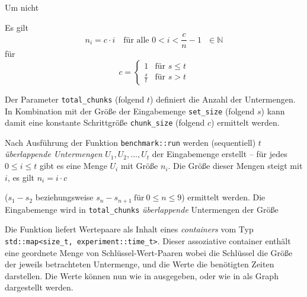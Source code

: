 Um nicht 

Es gilt
\begin{equation*}
	n_i = c \cdot i \quad \text{für alle $0 < i < \frac{c}{n} - 1$ $\in \mathbb{N}$}
\end{equation*}
für
\begin{equation*}
	c = \begin{cases}
		1 & \text{für $s \leq t$}\\
		\frac{s}{t} & \text{für $s > t$}
	\end{cases}
\end{equation*}

Der Parameter \lstinline{total_chunks} (folgend $t$) definiert die Anzahl der Untermengen. In Kombination mit der Größe der Eingabemenge \lstinline{set_size} (folgend $s$) kann damit eine konstante Schrittgröße \lstinline{chunk_size} (folgend $c$) ermittelt werden.

Nach Ausführung der Funktion \lstinline{benchmark::run} werden (sequentiell) $t$ \emph{überlappende Untermengen} $U_1, U_2, \ldots, U_t$ der Eingabemenge erstellt -- für jedes $0 \leq i \leq t$ gibt es eine Menge $U_i$ mit Größe $n_i$. Die Größe dieser Mengen steigt mit $i$, es gilt $n_i = i \cdot c$

($s_1 - s_2$ beziehungsweise $s_n - s_{n + 1}\ \text{für}\ 0 \leq n \le 9$) ermittelt werden. Die Eingabemenge wird in \lstinline{total_chunks} \emph{überlappende} Untermengen der Größe  

Die Funktion liefert Wertepaare als Inhalt eines \emph{containers} vom Typ \lstinline{std::map<size_t, experiment::time_t>}. Dieser assoziative container enthält eine geordnete Menge von Schlüssel-Wert-Paaren wobei die Schlüssel die Größe der jeweils betrachteten Untermenge, und die Werte die benötigten Zeiten darstellen. Die Werte können nun wie in  ausgegeben, oder wie in  als Graph dargestellt werden.


